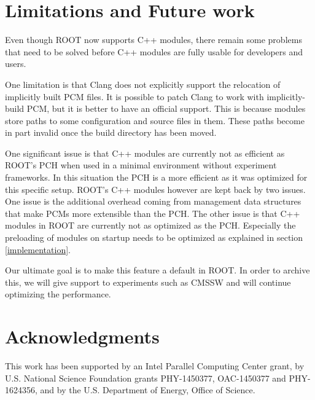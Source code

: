 \documentclass{webofc}
\begin{document}
\section{Limitations and Future work}
\label{limitationsandfuture}

Even though ROOT now supports C++ modules, there remain some problems that need to be solved before C++ modules are fully usable for developers and users.

One limitation is that Clang does not explicitly support the relocation of implicitly built PCM files. It is possible to patch Clang to work with implicitly-build PCM, but it is better to have an official support. This is because modules store paths to some configuration and source files in them. These paths become in part invalid once the build directory has been moved.


One significant issue is that C++ modules are currently not as efficient as ROOT's PCH when used in a minimal environment without experiment frameworks. In this situation the PCH is a more efficient as it was optimized for this specific setup. ROOT's C++ modules however are kept back by two issues. One issue is the additional overhead coming from management data structures that make PCMs more extensible than the PCH. The other issue is that C++ modules in ROOT are currently not as optimized as the PCH. Especially the preloading of modules on startup needs to be optimized as explained in section \ref{implementation}.

Our ultimate goal is to make this feature a default in ROOT. In order to archive this, we will give support to experiments such as CMSSW and will continue optimizing the performance.

\section{Acknowledgments}

This work has been supported by an Intel Parallel Computing Center grant, by U.S. National Science Foundation grants PHY-1450377, OAC-1450377 and PHY-1624356, and by the U.S. Department of Energy, Office of Science.
\end{document}
